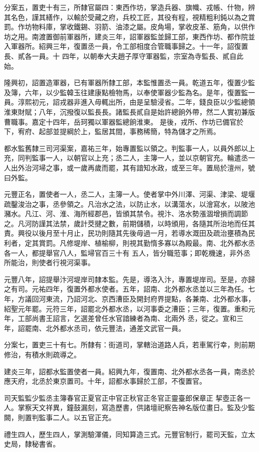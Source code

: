 \begin{pinyinscope}
 分案五，置吏十有三，所隸官屬四：東西作坊，掌造兵器、旗幟、戎帳、什物，辨其名色，謹其繕作，以輸於受藏之府，兵校工匠，其役有程，視精粗利鈍以為之賞罰。作坊物料庫，掌收鐵錫、羽箭、油漆之屬。皮角場，掌收皮革、筋角，以供作坊之用。南渡置御前軍器所，建炎三年，詔軍器監並歸工部，東西作坊、都作院並入軍器所。紹興三年，復置丞一員，令工部相度合管職事歸之。十一年，詔復置長、貳各一員。十
 四年，以朝奉大夫趙子厚守軍器監，宗室為寺監長、貳自此始。



 隆興初，詔置造軍器，已有軍器所隸工部，本監惟置丞一員。乾道五年，復置少監及簿，六年，以少監韓玉往建康點檢物馬，以奉使軍器少監為名。是年，復置監一員。淳熙初元，詔戎器非進入毋輒出所，由是呈驗浸省。二年，錢良臣以少監總領淮東財賦；八年，沉撥復以監長長。諸監長貳自是始許總餉外帶，然二人實初兼版曹職事。嘉定十四年，岳珂獨以軍器監總餉淮東。
 是後，戎所、作坊已備官於下，宥府、起部並提綱於上，監居其間，事務稀簡，特為儲才之所焉。



 都水監舊隸三司河渠案，嘉祐三年，始專置監以領之。判監事一人，以員外郎以上充，同判監事一人，以朝官以上充；丞二人，主簿一人，並以京朝官充。輪遣丞一人出外治河埽之事，或一歲再歲而罷，其有諳知水政，或至三年。置局於澶州，號曰外監。



 元豐正名，置使者一人，丞二人，主簿一人。使者掌中外川澤、河渠、津梁、堤堰
 疏鑿浚治之事，丞參領之。凡治水之法，以防止水，以溝蕩水，以澮寫水，以陂池瀦水。凡江、河、淮、海所經郡邑，皆頒其禁令。視汴、洛水勢漲涸增損而調節之。凡河防謹其法禁，歲計茭揵之數，前期儲積，以時頒用，各隨其所治地而任其責。興役以後月至十月止，民功則隨其先後毋過一月，若導水溉田及疏治壅積為民利者，定其賞罰。凡修堤岸、植榆柳，則視其勤惰多寡以為殿最。南、北外都水丞各一人，都提舉官八人，監埽官百三十有
 五人，皆分職蒞事；即乾機速，非外丞所能治，則使者行視河渠事。



 元豐八年，詔提舉汴河堤岸司隸本監。先是，導洛入汴，專置堤岸司。至是，亦歸之有司。元祐四年，復置外都水使者。五年，詔南、北外都水丞並以三年為任。七年，方議回河東流，乃詔河北、京西漕臣及開封府界提點，各兼南、北外都水事，紹聖元年罷。元符三年，詔罷北外都水丞，以河事委之漕臣；三年，復置。重和元年，工部尚書王詔言，乞選差曾任水官諳練者為南、北兩外
 丞，從之。宣和三年，詔罷南、北外都水丞司，依元豐法，通差文武官一員。



 分案七，置吏三十有七。所隸有：街道司，掌轄治道路人兵，若車駕行幸，則前期修治，有積水則疏導之。



 建炎三年，詔都水監置使者一員。紹興九年，復置南、北外都水丞各一員，南丞於應天府，北丞於東京置司。十年，詔都水事歸於工部，不復置官。



 司天監監少監丞主簿春官正夏官正中官正秋官正冬官正靈臺郎保章正
 挈壺正各一人。掌察天文祥異，鐘鼓漏刻，寫造歷書，供諸壇祀察告神名版位畫日。監及少監闕，則置判監事二人。以五官正充。



 禮生四人，歷生四人，掌測驗渾儀，同知算造三式。元豐官制行，罷司天監，立太史局，隸秘書省。



\end{pinyinscope}
